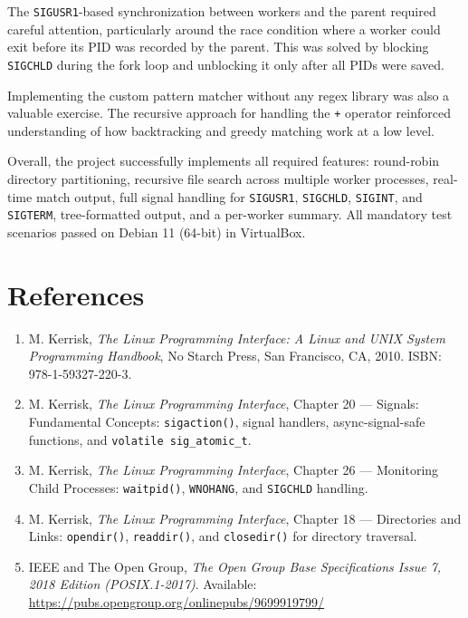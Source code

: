 \documentclass[12pt, a4paper]{article}
\begin{document}
The \texttt{SIGUSR1}-based synchronization between workers and the parent required careful attention, particularly around the race condition where a worker could exit before its PID was recorded by the parent. This was solved by blocking \texttt{SIGCHLD} during the fork loop and unblocking it only after all PIDs were saved.

Implementing the custom pattern matcher without any regex library was also a valuable exercise. The recursive approach for handling the \texttt{+} operator reinforced understanding of how backtracking and greedy matching work at a low level.

Overall, the project successfully implements all required features: round-robin directory partitioning, recursive file search across multiple worker processes, real-time match output, full signal handling for \texttt{SIGUSR1}, \texttt{SIGCHLD}, \texttt{SIGINT}, and \texttt{SIGTERM}, tree-formatted output, and a per-worker summary. All mandatory test scenarios passed on Debian 11 (64-bit) in VirtualBox.

\section{References}

\begin{enumerate}
    \item M. Kerrisk, \textit{The Linux Programming Interface: A Linux and UNIX System Programming Handbook}, No Starch Press, San Francisco, CA, 2010. ISBN: 978-1-59327-220-3.
    \item M. Kerrisk, \textit{The Linux Programming Interface}, Chapter 20 --- Signals: Fundamental Concepts: \texttt{sigaction()}, signal handlers, async-signal-safe functions, and \texttt{volatile sig\_atomic\_t}.
    \item M. Kerrisk, \textit{The Linux Programming Interface}, Chapter 26 --- Monitoring Child Processes: \texttt{waitpid()}, \texttt{WNOHANG}, and \texttt{SIGCHLD} handling.
    \item M. Kerrisk, \textit{The Linux Programming Interface}, Chapter 18 --- Directories and Links: \texttt{opendir()}, \texttt{readdir()}, and \texttt{closedir()} for directory traversal.
    \item IEEE and The Open Group, \textit{The Open Group Base Specifications Issue 7, 2018 Edition (POSIX.1-2017)}. Available: \url{https://pubs.opengroup.org/onlinepubs/9699919799/}
\end{enumerate}
\end{document}
